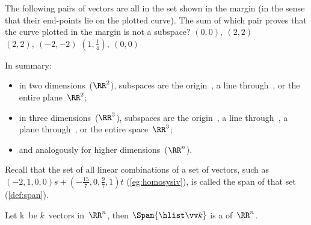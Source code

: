 \begin{activity}
The following pairs of vectors are all in the set shown in the margin (in the sense that their end-points lie on the plotted curve).  
%
The sum of which pair proves that the curve plotted in the margin is not a subspace?
{\((0,0),\ (2,2)\)}
{\((2,2),\ (-2,-2)\)}
{\((1,\frac14),\ (0,0)\)}
\end{activity}




In summary:
\begin{itemize}
\item in two dimensions~(\(\RR^2\)), subspaces are the origin~\ov, a line through~\ov, or the entire plane~\(\RR^2\);
\item in three dimensions~(\(\RR^3\)), subspaces are the origin~\ov, a line through~\ov, a plane through~\ov, or the entire space~\(\RR^3\);
\item and analogously for higher dimensions~(\(\RR^n\)).
\end{itemize}


Recall that the set of all linear combinations of a set of vectors, such as \((-2,1,0,0)s+(-\frac{15}7,0,\frac97,1)t\) (\autoref{eg:homosysiv}), is called the span of that set (\autoref{def:span}).

\begin{theorem} \label{thm:spansubs} 
Let \hlist\vv k\ be \(k\)~vectors in~\(\RR^n\),
then \(\Span\{\hlist\vv k\}\) is a  of~\(\RR^n\).
\end{theorem}

